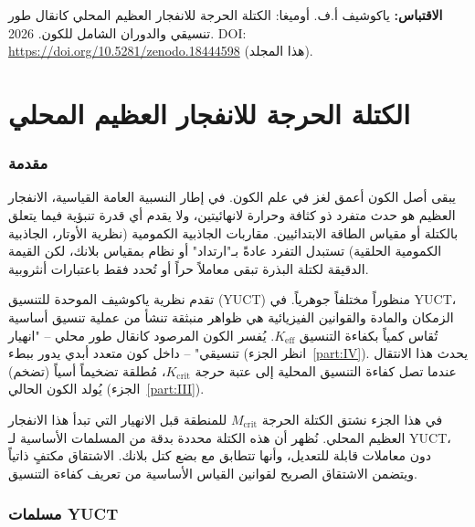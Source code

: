 \documentclass[12pt,a4paper]{article}
\begin{document}
	\vspace{0.1cm}
	\noindent
	{\color{darkblue}\textbf{الاقتباس:}} ياكوشيف أ.ف. أوميغا: الكتلة الحرجة للانفجار العظيم المحلي كانقال طور تنسيقي والدوران الشامل للكون. 2026. DOI: \url{https://doi.org/10.5281/zenodo.18444598} (هذا المجلد).
	
	\vspace{0.4cm}
	\clearpage
	\tableofcontents
	\clearpage
	
	\part{الكتلة الحرجة للانفجار العظيم المحلي}
	\label{part:I}
	
	\section{مقدمة}
	
	يبقى أصل الكون أعمق لغز في علم الكون. في إطار النسبية العامة القياسية، الانفجار العظيم هو حدث متفرد ذو كثافة وحرارة لانهائيتين، ولا يقدم أي قدرة تنبؤية فيما يتعلق بالكتلة أو مقياس الطاقة الابتدائيين. مقاربات الجاذبية الكمومية (نظرية الأوتار، الجاذبية الكمومية الحلقية) تستبدل التفرد عادةً بـ"ارتداد" أو نظام بمقياس بلانك، لكن القيمة الدقيقة لكتلة البذرة تبقى معاملاً حراً أو تُحدد فقط باعتبارات أنثروبية.
	
	تقدم نظرية ياكوشيف الموحدة للتنسيق (YUCT) منظوراً مختلفاً جوهرياً. في YUCT، الزمكان والمادة والقوانين الفيزيائية هي ظواهر منبثقة تنشأ من عملية تنسيق أساسية تُقاس كمياً بكفاءة التنسيق \(K_{\mathrm{eff}}\). يُفسر الكون المرصود كانقال طور محلي – "انهيار تنسيقي" – داخل كون متعدد أبدي يدور ببطء (انظر الجزء~\ref{part:IV}). يحدث هذا الانتقال عندما تصل كفاءة التنسيق المحلية إلى عتبة حرجة \(K_{\mathrm{crit}}\)، مُطلقة تضخيماً أسياً (تضخم) يُولد الكون الحالي (الجزء~\ref{part:III}).
	
	في هذا الجزء نشتق الكتلة الحرجة \(M_{\mathrm{crit}}\) للمنطقة قبل الانهيار التي تبدأ هذا الانفجار العظيم المحلي. نُظهر أن هذه الكتلة محددة بدقة من المسلمات الأساسية لـ YUCT، دون معاملات قابلة للتعديل، وأنها تتطابق مع بضع كتل بلانك. الاشتقاق مكتفٍ ذاتياً ويتضمن الاشتقاق الصريح لقوانين القياس الأساسية من تعريف كفاءة التنسيق.
	
	\section{مسلمات YUCT}
	
\end{document}
